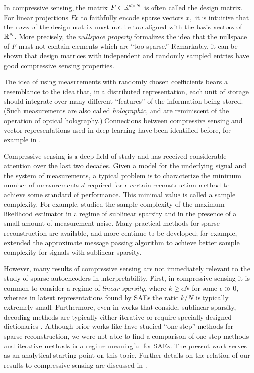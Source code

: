 In compressive sensing, the matrix $F \in \mathbb{R}^{d \times N}$ is often called the design matrix. For linear projections $F x$ to faithfully encode sparse vectors $x,$ it is intuitive that the rows of the design matrix must not be too aligned with the basis vectors of $\mathbb{R}^N.$ More precisely, the \textit{nullspace property} \citep{cohen_compressed_2009} formalizes the idea that the nullspace of $F$ must not contain elements which are ``too sparse.'' Remarkably, it can be shown that design matrices with independent and randomly sampled entries have good compressive sensing properties.

The idea of using measurements with randomly chosen coefficients bears a resemblance to the idea that, in a distributed representation, each unit of storage should integrate over many different ``features'' of the information being stored. (Such measurements are also called \textit{holographic}, and are reminiscent of the operation of optical holography.) Connections between compressive sensing and vector representations used in deep learning have been identified before, for example in \cite{arora_simple_2015}.

Compressive sensing is a deep field of study and has received considerable attention over the last two decades. Given a model for the underlying signal and the system of measurements, a typical problem is to characterize the minimum number of measurements $d$ required for a certain reconstruction method to achieve some standard of performance. This minimal value is called a sample complexity. For example, \cite{reeves_all-or-nothing_2019} studied the sample complexity of the maximum likelihood estimator in a regime of sublinear sparsity and in the presence of a small amount of measurement noise. Many practical methods for sparse reconstruction are available, and more continue to be developed; for example, \cite{takeuchi_generalized_2024} extended the approximate message passing algorithm to achieve better sample complexity for signals with sublinear sparsity.

However, many results of compressive sensing are not immediately relevant to the study of sparse autoencoders in interpretability. First, in compressive sensing it is common to consider a regime of \textit{linear sparsity}, where $k \ge \epsilon N$ for some $\epsilon \gg 0,$ whereas in latent representations found by SAEs the ratio $k/N$ is typically extremely small. Furthermore, even in works that consider sublinear sparsity, decoding methods are typically either iterative \citep{truong_fundamental_2023, takeuchi_generalized_2024} or require specially designed dictionaries \citep{li_sub-linear_2019}. Although prior works like \cite{bajwa_why_2010} have studied ``one-step'' methods for sparse reconstruction, we were not able to find a comparison of one-step methods and iterative methods in a regime meaningful for SAEs. The present work serves as an analytical starting point on this topic. Further details on the relation of our results to compressive sensing are discussed in .

